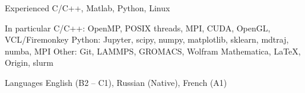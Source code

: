 

\begin{cvskills}

  \cvskill
    {Experienced} %
    {C/C++, \hspace{7pt} Matlab, \hspace{7pt} Python, \hspace{7pt} Linux} %

  \cvskill
    {In particular} %
    {\textsf{C/C++:} OpenMP, \hspace{4pt} POSIX threads, \hspace{4pt} MPI, \hspace{4pt} CUDA, \hspace{4pt} OpenGL, \hspace{4pt} VCL/Firemonkey \newline 
    \textsf{Python:} Jupyter, \hspace{4pt} scipy, \hspace{4pt} numpy, \hspace{4pt} matplotlib, \hspace{4pt} sklearn, \hspace{4pt} mdtraj, \hspace{4pt} numba, \hspace{4pt} MPI \newline
\textsf{Other:} Git, \hspace{4pt} LAMMPS, \hspace{4pt} GROMACS, \hspace{4pt} Wolfram Mathematica, \hspace{4pt} \LaTeX, \hspace{4pt} Origin, \hspace{4pt} slurm} %

  \cvskill
    {Languages} %
    {English (B2 -- C1), \hspace{7pt} Russian (Native), \hspace{7pt} French (A1)} %

\end{cvskills}
